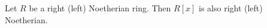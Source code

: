 \documentclass[12pt]{article}
\begin{document}
Let $R$ be a right (left) Noetherian ring. Then $R[x]$ is also right (left) Noetherian.
\end{document}
